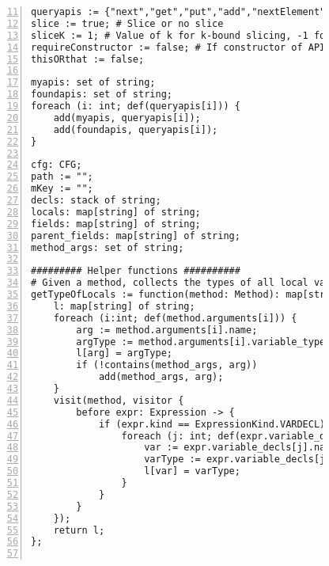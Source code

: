 \begin{figure}[ht!]
\begin{lstlisting}[numbers=left, tabsize=4, escapechar=@, caption={API Usage Mining Analysis},label={lst:aun-code}, firstline = 11, firstnumber = 11, lastline = 60]
queryapis := {"next","get","put","add","nextElement","elementAt","size","remove","nextToken","toArray","getString","group","getProperty","iterator","addElement","info","compile","containsKey","matcher","setProperty","contains","fine","set","keySet","addAll","nextInt","log","entrySet","pop","warning","asList","getTime","push","indexOf","subList","fill","values","clear","getTimeZone","hasNext","getBundle","sort","finest","getLogger","end","start","store","removeElementAt","setTime","removeFirst","severe","finer","copyInto","getKey","peek","insertElementAt","hasMoreTokens","getValue","getName","previous","compare","getBoolean","isEmpty","copyOf","load","elements","getInputStream","getInt","schedule","removeElement","firstElement","appendReplacement","userNodeForPackage","setElementAt","putAll","unmodifiableList","replaceAll","write","split","nextLine","hasMoreElements","after","noneOf","removeLast","before","removeAll","listIterator","addLast","cancel","groupCount","putInt","equals","addFirst","toString","singleton","singletonList","node","getFirst","matches","keys","putBoolean","getLast","copyOfRange","binarySearch","compareTo","isDirectory","scheduleAtFixedRate","nextSetBit","hashCode","setTimeInMillis","config","allOf","getLanguage","poll","find","entering","first","setSize","lastElement","replaceFirst","compareAndSet","putIfAbsent"}; # API methods
slice := true; # Slice or no slice
sliceK := 1; # Value of k for k-bound slicing, -1 for infinity
requireConstructor := false; # If constructor of API class are of interest
thisORthat := false;

myapis: set of string;
foundapis: set of string;
foreach (i: int; def(queryapis[i])) {
    add(myapis, queryapis[i]);   
    add(foundapis, queryapis[i]);
}

cfg: CFG;
path := "";
mKey := "";
decls: stack of string;
locals: map[string] of string;
fields: map[string] of string;
parent_fields: map[string] of string;
method_args: set of string;

######### Helper functions ##########
# Given a method, collects the types of all local variables including method parameters
getTypeOfLocals := function(method: Method): map[string] of string {
    l: map[string] of string;
    foreach (i:int; def(method.arguments[i])) {
        arg := method.arguments[i].name;
        argType := method.arguments[i].variable_type.name;
        l[arg] = argType;
        if (!contains(method_args, arg))
            add(method_args, arg);
    }
    visit(method, visitor {
        before expr: Expression -> {            
            if (expr.kind == ExpressionKind.VARDECL) {
                foreach (j: int; def(expr.variable_decls[j])) {
                    var := expr.variable_decls[j].name;
                    varType := expr.variable_decls[j].variable_type.name;
                    l[var] = varType;
                }
            }
        }
    });
    return l;
};


\end{lstlisting}
\end{figure}
